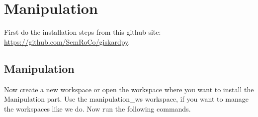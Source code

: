 \documentclass[main.tex]{subfiles}
\begin{document}
\section{Manipulation}
\label{sec:Manipulation}

First do the installation steps from this github site:\\
	\url{https://github.com/SemRoCo/giskardpy}.\\
	
	\subsection{Manipulation}
Now create a new workspace or open the workspace where you want to install the Manipulation part. Use the manipulation\_ws workspace, if you want to manage the workspaces like we do. Now run the following commands.	

\begin{mdframed}[backgroundcolor=mygray, rightline=false]

\end{mdframed}
	
	
\end{document}
